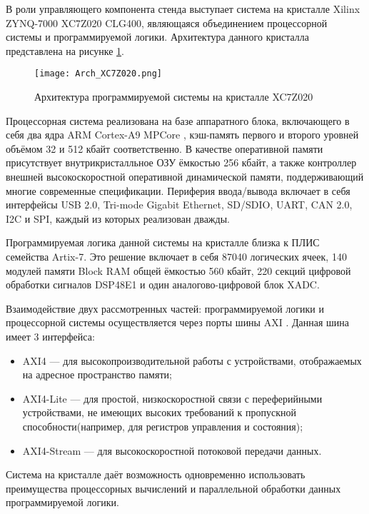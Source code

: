 В роли управляющего компонента стенда выступает система на кристалле Xilinx ZYNQ-7000 XC7Z020 CLG400, являющаяся объединением процессорной системы и программируемой логики. Архитектура данного кристалла представлена на рисунке \ref{fig:Arch_XC7Z020}.\par
\begin{figure}[ht]
    \centering
    \texttt{[image: Arch\_XC7Z020.png]}
    \caption{Архитектура программируемой системы на кристалле XC7Z020}
    \label{fig:Arch_XC7Z020}
\end{figure}
Процессорная система реализована на базе аппаратного блока, включающего в себя два ядра ARM Cortex-A9 MPCore \parencite{Cortex-A9}, кэш-память первого и второго уровней объёмом 32 и 512 кбайт соответственно. В качестве оперативной памяти присутствует внутрикристалльное ОЗУ ёмкостью 256 кбайт, а также контроллер внешней высокоскоростной оперативной динамической памяти, поддерживающий многие современные спецификации. Периферия ввода/вывода включает в себя интерфейсы USB 2.0, Tri-mode Gigabit Ethernet, SD/SDIO, UART, CAN 2.0, I2C и SPI, каждый из которых реализован дважды.\par
Программируемая логика данной системы на кристалле близка к ПЛИС семейства Artix-7. Это решение включает в себя 87040 логических ячеек, 140 модулей памяти Block RAM общей ёмкостью 560 кбайт, 220 секций цифровой обработки сигналов DSP48E1 и один аналогово-цифровой блок XADC.\par
Взаимодействие двух рассмотренных частей: программируемой логики и процессорной системы осуществляется через порты шины AXI \parencite{AXI}. Данная шина имеет 3 интерфейса:
\begin{itemize}
    \item AXI4 --- для высокопроизводительной работы с устройствами, отображаемых на адресное пространство памяти;
    \item AXI4-Lite --- для простой, низкоскоростной связи с переферийными устройствами, не имеющих высоких требований к пропускной способности(например, для регистров управления и состояния);
    \item AXI4-Stream --- для высокоскоростной потоковой передачи данных.
\end{itemize}\par
Система на кристалле даёт возможность одновременно использовать преимущества процессорных вычислений и параллельной обработки данных программируемой логики.
